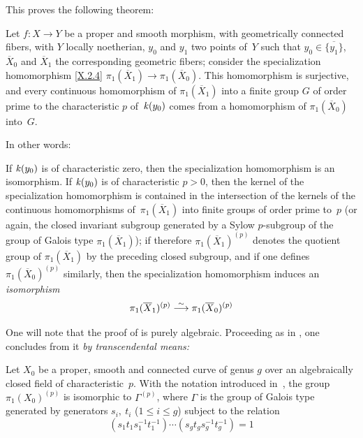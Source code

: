 This proves the following theorem:

\begin{theorem}
\label{X.3.8}
Let $f\colon X\to Y$ be a proper and smooth morphism, with
geometrically connected fibers, with $Y$ locally noetherian,
$y_0$ and $y_1$ two points of~$Y$ such that
$y_0\in\overline{\{y_1\}}$,
$\overline{X}_0$ and $\overline{X}_1$ the corresponding geometric
fibers; consider the specialization homomorphism
\eqref{X.2.4} $\pi_1(\overline X_1)\to\pi_1(\overline X_0)$. This
homomorphism is surjective, and every continuous homomorphism of
$\pi_1(\overline X_1)$ into a finite group $G$ of order prime to
the characteristic $p$ of~$\mathit{k}(y_0)$ comes from a homomorphism of
$\pi_1(\overline{X}_0)$ into~$G$.
\end{theorem}

In other words:

\begin{corollary}
\label{X.3.9}
If $\mathit{k}(y_0)$ is of characteristic zero, then the specialization
homomorphism is an isomorphism. If
$\mathit{k}(y_0)$ is of characteristic $p>0$,
then the kernel of
the specialization homomorphism is contained in the intersection
of the kernels of the continuous homomorphisms of~$\pi_1(\overline X_1)$ into
finite groups of order prime to~$p$ (or again, the closed invariant
subgroup generated by a Sylow $p$-subgroup of the
group of Galois type $\pi_1(\overline X_1)$); if therefore
$\pi_1(\overline X_1)^{(p)}$
denotes the quotient group of
$\pi_1(\overline X_1)$ by the preceding closed subgroup,
and if one defines $\pi_1(\overline X_0)^{(p)}$ similarly, then
the specialization homomorphism induces an \emph{isomorphism}
$$
\pi_1(\overline X_1)^{(p)}\overset{\sim}{\longrightarrow} \pi_1(\overline X_0)^{(p)}
$$
\end{corollary}

One will note that the proof of  is purely algebraic.
Proceeding as in , one concludes from it \emph{by
transcendental means:}

\begin{corollary}
\label{X.3.10}
Let $X_0$ be a proper, smooth and connected curve of genus $g$ over an
algebraically closed field of characteristic~$p$. With
the notation introduced in~, the group $\pi_1(X_0)^{(p)}$
is isomorphic to $\Gamma^{(p)}$, where $\Gamma$ is the group of
Galois type generated by generators $s_i,~t_i$
($1\le i\le g$) subject to the relation
$$
(s_1t_1s_1^{-1}t_1^{-1})\cdots (s_gt_gs_g^{-1}t_g^{-1})=1
$$
\end{corollary}

